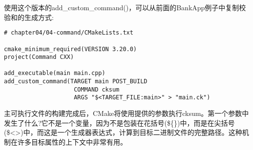 使用这个版本的add\_custom\_command()，可以从前面的BankApp例子中复制校验和的生成方式:

\begin{lstlisting}[style=styleCMake]
# chapter04/04-command/CMakeLists.txt

cmake_minimum_required(VERSION 3.20.0)
project(Command CXX)

add_executable(main main.cpp)
add_custom_command(TARGET main POST_BUILD
					COMMAND cksum
					ARGS "$<TARGET_FILE:main>" > "main.ck")
\end{lstlisting}

主可执行文件的构建完成后，CMake将使用提供的参数执行cksum。第一个参数中发生了什么?它不是一个变量，因为不是包装在花括号(\$\{\})中，而是在尖括号(\$<>)中，而这是一个生成器表达式，计算到目标二进制文件的完整路径。这种机制在许多目标属性的上下文中非常有用。


